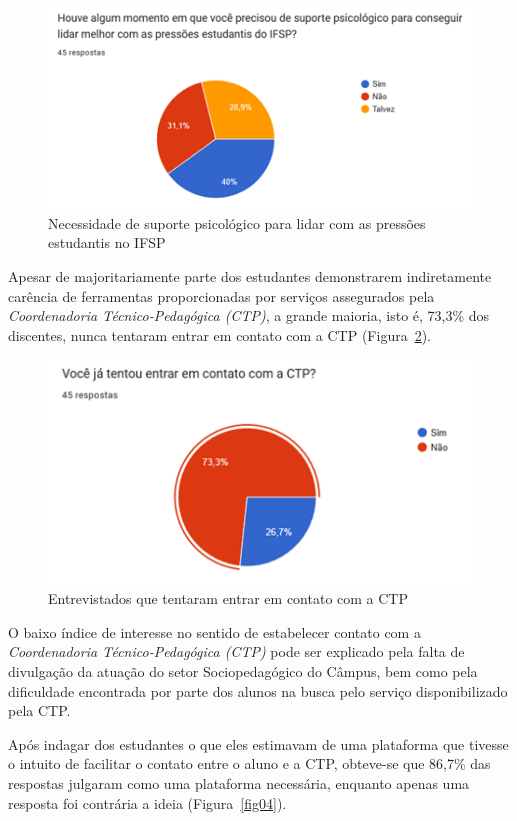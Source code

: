 \documentclass[12pt,a4paper]{article}
\begin{document}
\begin{figure}[H]
    \centering
    \includegraphics[width=14cm]{img2.png}
    \caption{Necessidade de suporte psicológico para lidar com as pressões estudantis no IFSP}
    \label{fig02}
\end{figure}

Apesar de majoritariamente parte dos estudantes demonstrarem indiretamente carência de ferramentas proporcionadas por serviços assegurados pela \textit{Coordenadoria Técnico-Pedagógica (CTP)}, a grande maioria, isto é, 73,3\% dos discentes, nunca tentaram entrar em contato com a CTP (Figura~\ref{fig03}).

\begin{figure}[H]
    \centering
    \includegraphics[width=12cm]{img3.png}
    \caption{Entrevistados que tentaram entrar em contato com a CTP}
    \label{fig03}
\end{figure}

O baixo índice de interesse no sentido de estabelecer contato com a \textit{Coordenadoria
Técnico-Pedagógica (CTP)} pode ser explicado pela falta de divulgação da atuação do setor Sociopedagógico do Câmpus, bem como pela dificuldade encontrada por parte dos alunos na busca pelo serviço disponibilizado pela CTP.

Após indagar dos estudantes o que eles estimavam de uma plataforma que tivesse o intuito de facilitar o contato entre o aluno e a CTP, obteve-se que 86,7\% das respostas julgaram como uma plataforma necessária, enquanto apenas uma resposta foi contrária a ideia (Figura~\ref{fig04}).
\end{document}
